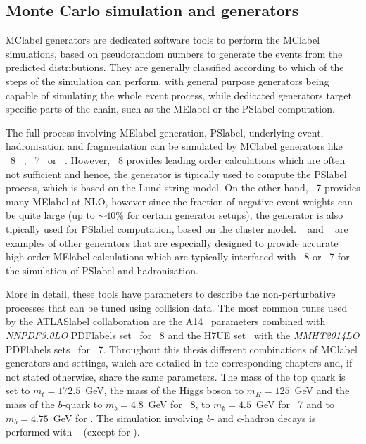 \subsection{Monte Carlo simulation and generators}

\acrshort{MClabel} generators are dedicated software tools to perform the \acrshort{MClabel} simulations, based on pseudorandom numbers to generate the events from the predicted distributions. They are generally classified according to which of the steps of the simulation can perform, with general purpose generators being capable of simulating the whole event process, while dedicated generators target specific parts of the chain, such as the \acrshort{MElabel} or the \acrshort{PSlabel} computation.

The full process involving \acrshort{MElabel} generation, \acrshort{PSlabel}, underlying event, hadronisation and fragmentation can be simulated by \acrshort{MClabel} generators like \PYTHIA~8~\cite{SJOSTRAND2015159}
, \HERWIG~7~\cite{Bahr2008,Bellm2016}
or \SHERPA~\cite{10.21468SciPostPhys.7.3.034}. However, \PYTHIA~8 provides leading order calculations which are often not sufficient and hence, the generator is tipically used to compute the \acrshort{PSlabel} process, which is based on the Lund string model. On the other hand, \HERWIG~7 provides many \acrshort{MElabel} at NLO, however since the fraction of negative event weights can be quite large (up to $\sim40\%$ for certain generator setups), the generator is also tipically used for \acrshort{PSlabel} computation, based on the cluster model. \POWHEGBOX~\cite{Nason_2004,Frixione_2007,Alioli2010,PhysRevD.91.094003,Frixione_20072}
and \MGMCatNLO~\cite{Alwall_2007}
are examples of other generators that are especially designed to provide accurate high-order \acrshort{MElabel} calculations which are typically interfaced with \PYTHIA~8 or \HERWIG~7 for the simulation of \acrshort{PSlabel} and hadronisation. 

More in detail, these tools have parameters to describe the non-perturbative processes that can be tuned using collision data. The most common tunes used by the \acrshort{ATLASlabel} collaboration are the A14~\cite{ATL-PHYS-PUB-2014-021} parameters combined with \textit{NNPDF3.0LO} \acrshort{PDFlabel}s set~\cite{BALL2013244} for \PYTHIA~8 and the H7UE set~\cite{Bellm2016} with the \textit{MMHT2014LO} \acrshort{PDFlabel}s sets~\cite{Harland-Lang2015} for \HERWIG~7. Throughout this thesis different combinations of \acrshort{MClabel} generators and settings, which are detailed in the corresponding chapters and, if not stated otherwise, share the same parameters. The mass of the top quark is set to $m_t=172.5$~GeV, the mass of the Higgs boson to $m_H=125$~GeV and the mass of the $b$-quark to $m_b=4.8$~GeV for \PYTHIA~8, to $m_b=4.5$~GeV for \HERWIG~7 and to $m_b=4.75$~GeV for \SHERPA. The simulation involving $b$- and $c$-hadron decays is performed with \EVTGEN~\cite{LANGE2001152}
(except for \SHERPA). 


